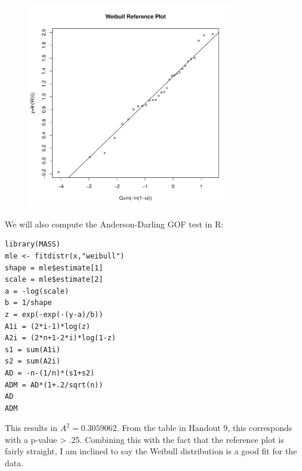 \documentclass{article}
\begin{document}
\begin{enumerate}
\begin{figure}[htbp]
    \centering
    \includegraphics[width=0.8\textwidth]{Rplots.pdf}
\end{figure}
\newpage
We will also compute the Anderson-Darling GOF test in R: \\
\begin{verbatim}
library(MASS)
mle <- fitdistr(x,"weibull")
shape = mle$estimate[1]
scale = mle$estimate[2]
a = -log(scale)
b = 1/shape
z = exp(-exp(-(y-a)/b))
A1i = (2*i-1)*log(z)
A2i = (2*n+1-2*i)*log(1-z)
s1 = sum(A1i)
s2 = sum(A2i)
AD = -n-(1/n)*(s1+s2)
ADM = AD*(1+.2/sqrt(n))
AD
ADM
\end{verbatim}
This results in $A^2 = 0.3059062$. From the table in Handout 9, this corresponds with a p-value > .25. Combining this with the fact that the reference plot is fairly straight, I am inclined to say the Weibull distribution is a good fit for the data.
\end{enumerate}
\end{document}
